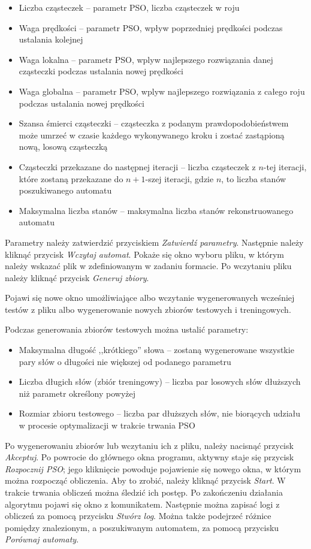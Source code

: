 \documentclass{../llncs_template_final/llncs}
\begin{document}
\begin{itemize}
\item Liczba cząsteczek -- parametr PSO, liczba cząsteczek w roju
\item Waga prędkości -- parametr PSO, wpływ poprzedniej prędkości podczas ustalania kolejnej
\item Waga lokalna -- parametr PSO, wplyw najlepszego rozwiązania danej cząsteczki podczas ustalania nowej prędkości
\item Waga globalna -- parametr PSO, wplyw najlepszego rozwiązania z całego roju podczas ustalania nowej prędkości
\item Szansa śmierci cząsteczki -- cząsteczka z podanym prawdopodobieństwem może umrzeć w czasie każdego wykonywanego kroku i zostać zastąpioną nową, losową cząsteczką
\item Cząsteczki przekazane do następnej iteracji -- liczba cząsteczek z $n$-tej iteracji, które zostaną przekazane do $n+1$-szej iteracji, gdzie $n$, to liczba stanów poszukiwanego automatu
\item Maksymalna liczba stanów -- maksymalna liczba stanów rekonstruowanego automatu
\end{itemize}

Parametry należy zatwierdzić przyciskiem \emph{Zatwierdź parametry}. Następnie należy kliknąć przycisk \emph{Wczytaj automat}. Pokaże się okno wyboru pliku, w którym należy wskazać plik w zdefiniowanym w zadaniu formacie. Po wczytaniu pliku należy kliknąć przycisk \emph{Generuj zbiory}.

Pojawi się nowe okno umożliwiające albo wczytanie wygenerowanych wcześniej testów z pliku albo wygenerowanie nowych zbiorów testowych i treningowych.

 Podczas generowania zbiorów testowych można ustalić parametry:

\begin{itemize}
\item Maksymalna długość ,,krótkiego'' słowa -- zostaną wygenerowane wszystkie pary słów o długości nie większej od podanego parametru
\item Liczba długich słów (zbiór treningowy) -- liczba par losowych słów dłuższych niż parametr określony powyżej
\item Rozmiar zbioru testowego -- liczba par dłuższych słów, nie biorących udziału w procesie optymalizacji w trakcie trwania PSO
\end{itemize}

Po wygenerowaniu zbiorów lub wczytaniu ich z pliku, należy nacisnąć przycisk \emph{Akceptuj}. Po powrocie do głównego okna programu, aktywny staje się przycisk \emph{Rozpocznij PSO}; jego kliknięcie powoduje pojawienie się nowego okna, w którym można rozpocząć obliczenia. Aby to zrobić, należy kliknąć przycisk \emph{Start}. W trakcie trwania obliczeń można śledzić ich postęp. Po zakończeniu działania algorytmu pojawi się okno z komunikatem. Następnie można zapisać logi z obliczeń za pomocą przycisku \emph{Stwórz log}. Można także podejrzeć różnice pomiędzy znalezionym, a poszukiwanym automatem, za pomocą przycisku \emph{Porównaj automaty}. 
\end{document}

